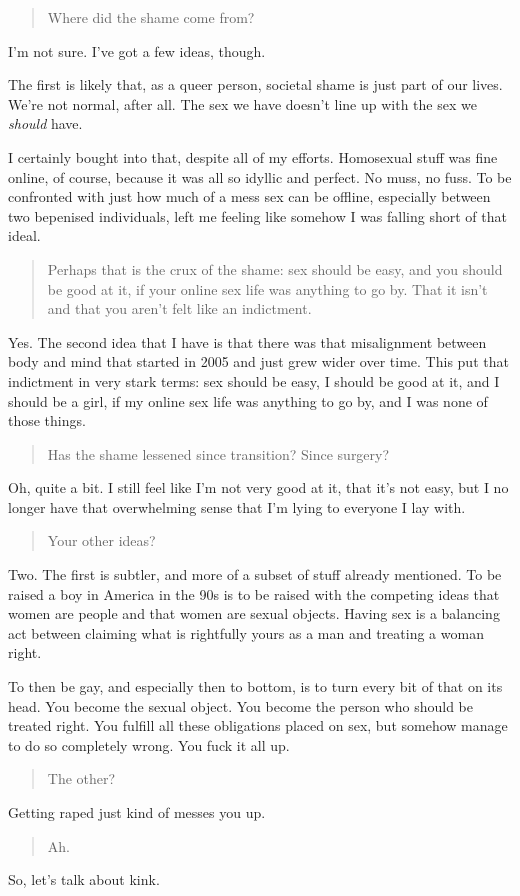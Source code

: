 \begin{quote}
Where did the shame come from?
\end{quote}

I'm not sure. I've got a few ideas, though.

The first is likely that, as a queer person, societal shame is just part of our lives. We're not normal, after all. The sex we have doesn't line up with the sex we \emph{should} have.

I certainly bought into that, despite all of my efforts. Homosexual stuff was fine online, of course, because it was all so idyllic and perfect. No muss, no fuss. To be confronted with just how much of a mess sex can be offline, especially between two bepenised individuals, left me feeling like somehow I was falling short of that ideal.

\begin{quote}
Perhaps that is the crux of the shame: sex should be easy, and you should be good at it, if your online sex life was anything to go by. That it isn't and that you aren't felt like an indictment.
\end{quote}

Yes. The second idea that I have is that there was that misalignment between body and mind that started in 2005 and just grew wider over time. This put that indictment in very stark terms: sex should be easy, I should be good at it, and I should be a girl, if my online sex life was anything to go by, and I was none of those things.

\begin{quote}
Has the shame lessened since transition? Since surgery?
\end{quote}

Oh, quite a bit. I still feel like I'm not very good at it, that it's not easy, but I no longer have that overwhelming sense that I'm lying to everyone I lay with.

\begin{quote}
Your other ideas?
\end{quote}

Two. The first is subtler, and more of a subset of stuff already mentioned. To be raised a boy in America in the 90s is to be raised with the competing ideas that women are people and that women are sexual objects. Having sex is a balancing act between claiming what is rightfully yours as a man and treating a woman right.

To then be gay, and especially then to bottom, is to turn every bit of that on its head. You become the sexual object. You become the person who should be treated right. You fulfill all these obligations placed on sex, but somehow manage to do so completely wrong. You fuck it all up.

\begin{quote}
The other?
\end{quote}

Getting raped just kind of messes you up.

\begin{quote}
Ah.
\end{quote}

So, let's talk about kink.
